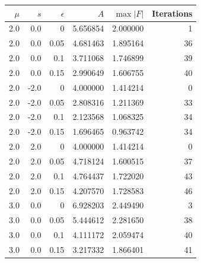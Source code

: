 \begin{tabular}{rrrrrr}
\toprule
$\mu$ & $s$ & $\epsilon$ & $A$ & $\max|F|$ & Iterations \\
\midrule
2.0 & 0.0 & 0 & 5.656854 & 2.000000 & 1 \\
2.0 & 0.0 & 0.05 & 4.681463 & 1.895164 & 36 \\
2.0 & 0.0 & 0.1 & 3.711068 & 1.746899 & 39 \\
2.0 & 0.0 & 0.15 & 2.990649 & 1.606755 & 40 \\
2.0 & -2.0 & 0 & 4.000000 & 1.414214 & 0 \\
2.0 & -2.0 & 0.05 & 2.808316 & 1.211369 & 33 \\
2.0 & -2.0 & 0.1 & 2.123568 & 1.068325 & 34 \\
2.0 & -2.0 & 0.15 & 1.696465 & 0.963742 & 34 \\
2.0 & 2.0 & 0 & 4.000000 & 1.414214 & 0 \\
2.0 & 2.0 & 0.05 & 4.718124 & 1.600515 & 37 \\
2.0 & 2.0 & 0.1 & 4.764437 & 1.722020 & 43 \\
2.0 & 2.0 & 0.15 & 4.207570 & 1.728583 & 46 \\
3.0 & 0.0 & 0 & 6.928203 & 2.449490 & 3 \\
3.0 & 0.0 & 0.05 & 5.444612 & 2.281650 & 38 \\
3.0 & 0.0 & 0.1 & 4.111172 & 2.059474 & 40 \\
3.0 & 0.0 & 0.15 & 3.217332 & 1.866401 & 41 \\
\bottomrule
\end{tabular}
